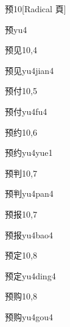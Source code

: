 \begin{entry}{预}{10}[Radical 頁]
  \begin{phonetics}{预}{yu4}
  \end{phonetics}
\end{entry}

\begin{entry}{预见}{10,4}
  \begin{phonetics}{预见}{yu4jian4}
  \end{phonetics}
\end{entry}

\begin{entry}{预付}{10,5}
  \begin{phonetics}{预付}{yu4fu4}
  \end{phonetics}
\end{entry}

\begin{entry}{预约}{10,6}
  \begin{phonetics}{预约}{yu4yue1}
  \end{phonetics}
\end{entry}

\begin{entry}{预判}{10,7}
  \begin{phonetics}{预判}{yu4pan4}
  \end{phonetics}
\end{entry}

\begin{entry}{预报}{10,7}
  \begin{phonetics}{预报}{yu4bao4}
  \end{phonetics}
\end{entry}

\begin{entry}{预定}{10,8}
  \begin{phonetics}{预定}{yu4ding4}
  \end{phonetics}
\end{entry}

\begin{entry}{预购}{10,8}
  \begin{phonetics}{预购}{yu4gou4}
  \end{phonetics}
\end{entry}

